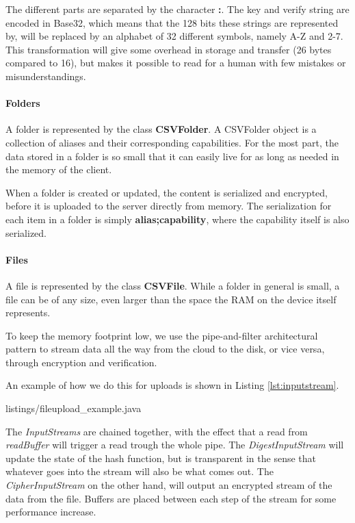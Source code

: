 \documentclass[pdftex,english,10pt,b5paper,twoside]{book}
\begin{document}
The different parts are separated by the character \textbf{:}. The key and
verify string are encoded in Base32, which means that the 128 bits these
strings are represented by, will be replaced by an alphabet of 32 different
symbols, namely A-Z and 2-7. This transformation will give some overhead in
storage and transfer (26 bytes compared to 16), but makes it possible to read for a human
with few mistakes or misunderstandings.

\paragraph{Folders}

A folder is represented by the class \textbf{CSVFolder}. A CSVFolder object is
a collection of aliases and their corresponding capabilities. For
the most part, the data stored in a folder is so small that it can easily live for 
as long as needed in the memory of the client. 

When a folder is created or updated, the content is serialized and encrypted,
before it is uploaded to the server directly from memory. The serialization for
each item in a folder is simply \textbf{alias;capability}, where the capability
itself is also serialized.

\paragraph{Files}

A file is represented by the class \textbf{CSVFile}. While a folder in general is small,
a file can be of any size, even larger than the space the \ac{RAM} on the
device itself represents. 

To keep the memory footprint low, we use the pipe-and-filter architectural
pattern to stream data all the way from the cloud to the disk, or vice versa,
through encryption and verification. 

An example of how we do this for uploads is shown in Listing
\ref{lst:inputstream}. 


{listings/fileupload_example.java}

The \emph{InputStreams} are chained together, with the effect that a read from
\emph{readBuffer} will trigger a read trough the whole pipe. The
\emph{DigestInputStream} will update the state of the hash function, but is
transparent in the sense that whatever goes into the stream will also be what
comes out. The \emph{CipherInputStream} on the other hand, will output an encrypted
stream of the data from the file. Buffers are placed between each step of the
stream for some performance increase.
\end{document}

